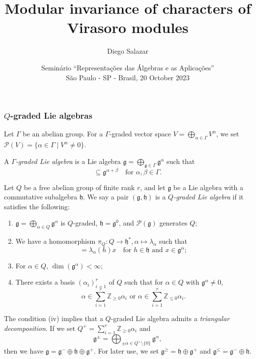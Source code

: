 \documentclass{beamer}
\title[Modular inv.\ of char.\ of Virasoro modules]{Modular invariance of characters of Virasoro modules}
\author[Salazar]{Diego Salazar\inst{1}}
\institute[IMPA]{\inst{1} Instituto de Matemática Pura e Aplicada (IMPA)}
\date[20 October 2023]{Seminário ``Representações das Álgebras e as Aplicações'' \\
  São Paulo - SP - Brasil, 20 October 2023}
\begin{document}
\maketitle

\begin{frame}
  \frametitle{$Q$-graded Lie algebras}
  Let $\Gamma$ be an abelian group.
  For a $\Gamma$-graded vector space $V = \bigoplus_{\alpha \in \Gamma}V^{\alpha}$, we set $\mathcal{P}(V) = \{\alpha \in \Gamma \mid V^{\alpha} \neq 0\}$.

  A \emph{$\Gamma$-graded Lie algebra} is a Lie algebra $\mathfrak{g} = \bigoplus_{\mathfrak{g} \in \Gamma}\mathfrak{g}^{\alpha}$ such that
  \begin{equation*}
    [\mathfrak{g}^{\alpha}, \mathfrak{g}^{\beta}] \subseteq \mathfrak{g}^{\alpha + \beta} \quad \text{for $\alpha, \beta \in \Gamma$}.
  \end{equation*}

  Let $Q$ be a free abelian group of finite rank $r$, and let $\mathfrak{g}$ be a Lie algebra with a commutative subalgebra $\mathfrak{h}$.
  We say a pair $(\mathfrak{g}, \mathfrak{h})$ is a \emph{$Q$-graded Lie algebra} if it satisfies the following:
  \begin{enumerate}
  \item $\mathfrak{g} = \bigoplus_{\alpha \in Q}\mathfrak{g}^{\alpha}$ is $Q$-graded, $\mathfrak{h} = \mathfrak{g}^0$, and $\mathcal{P}(\mathfrak{g})$ generates $Q$;
  \item We have a homomorphism $\pi_Q: Q \to \mathfrak{h}^*, \alpha \mapsto \lambda_{\alpha}$ such  that
    \begin{equation*}
      [h, x] = \lambda_{\alpha}(h)x \quad \text{for $h \in \mathfrak{h}$ and $x \in \mathfrak{g}^{\alpha}$};
    \end{equation*}
  \item For $\alpha \in Q$, $\dim(\mathfrak{g}^{\alpha}) < \infty$;
  \item There exists a basis $(\alpha_i)_{i = 1}^r$ of $Q$ such that for $\alpha \in Q$ with $\mathfrak{g}^{\alpha} \neq 0$,
    \begin{equation*}
      \text{$\alpha \in \sum_{i = 1}^r\mathbb{Z}_{\ge 0}\alpha_i$ or $\alpha \in \sum_{i = 1}^r\mathbb{Z}_{\le 0}\alpha_i$}.
    \end{equation*}
  \end{enumerate}
\end{frame}

\begin{frame}
  The condition (iv) implies that a $Q$-graded Lie algebra admits a \emph{triangular decomposition}.
  If we set $Q^+ = \sum_{i = 1}^r\mathbb{Z}_{\ge 0}\alpha_i$ and
  \begin{equation*}
    \mathfrak{g}^{\pm} = \bigoplus_{\pm \alpha \in Q^+ \setminus \{0\}}\mathfrak{g}^{\alpha},
  \end{equation*}
  then we have $\mathfrak{g} = \mathfrak{g}^- \oplus \mathfrak{h} \oplus \mathfrak{g}^+$.
  For later use, we set $\mathfrak{g}^{\ge} = \mathfrak{h} \oplus \mathfrak{g}^+$ and $\mathfrak{g}^{\le} = \mathfrak{g}^- \oplus \mathfrak{h}$.
\end{frame}
\end{document}
